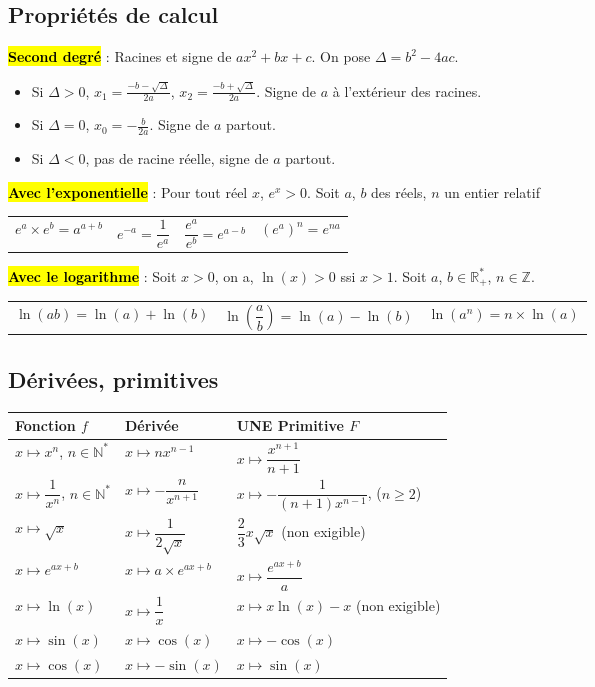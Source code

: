 \documentclass[10pt,fleqn, openany, landscape, twocolumn]{book} %
\begin{document}
\subsection*{Propriétés de calcul}

\hl{\textbf{Second degré}} : Racines et signe de $ax^2+bx+c$. On pose $\Delta=b^2-4ac$.
\begin{itemize}
\item Si $\Delta >0$, $x_1=\frac{-b-\sqrt{\Delta}}{2a}$, $x_2=\frac{-b+\sqrt{\Delta}}{2a}$. Signe de $a$ à l'extérieur des racines.
\item Si $\Delta=0$, $x_0=-\frac{b}{2a}$. Signe de $a$ partout.
\item Si $\Delta<0$, pas de racine réelle, signe de $a$ partout.
\end{itemize}

\hl{\textbf{Avec l'exponentielle}} : Pour tout réel $x$, $e^x>0$. Soit $a$, $b$ des réels, $n$ un entier relatif

\begin{tabularx}{\linewidth}{XXXX}
$e^a\times e^b = a^{a+b}$ & $e^{-a}=\dfrac{1}{e^a}$ & $\dfrac{e^a}{e^b}=e^{a-b}$ & $(e^a)^n=e^{na}$
\end{tabularx}

\hl{\textbf{Avec le logarithme}} : Soit $x>0$, on a, $\ln(x)>0$ ssi $x>1$. Soit $a$, $b \in \mathbb{R}_+^*$, $n\in\mathbb{Z}$.

\begin{tabularx}{\linewidth}{XXX}
$\ln(ab)=\ln(a)+\ln(b)$ & $\ln\left(\dfrac{a}{b}\right)=\ln(a)-\ln(b)$ & $\ln(a^n)=n \times \ln(a)$
\end{tabularx}

\subsection*{Dérivées, primitives}
\renewcommand{\arraystretch}{2.2}
\begin{tabularx}{\linewidth}{|X|X|X|}

\hline
Fonction $f$ & Dérivée & \textbf{UNE} Primitive $F$  \\
\hline
$x \mapsto x^n$, $n\in \mathbb{N}^*$ & $x\mapsto nx^{n-1}$ & $x\mapsto \dfrac{x^{n+1}}{n+1}$   \\
\hline
$x \mapsto \dfrac{1}{x^n}$, $n\in \mathbb{N}^*$ & $x\mapsto -\dfrac{n}{x^{n+1}}$ & $x\mapsto -\dfrac{1}{(n+1)x^{n-1}}$, ($n \geqslant 2$) \\
\hline
$x\mapsto \sqrt{x}$ & $x \mapsto\dfrac{1}{2\sqrt{x}}$ & $\dfrac{2}{3}x\sqrt{x}$ (non exigible)  \\
\hline
$x \mapsto e^{ax+b}$ & $x\mapsto a \times e^{ax+b}$ & $x\mapsto \dfrac{e^{ax+b}}{a}$ \\
\hline
$x \mapsto \ln(x)$ & $x\mapsto \dfrac{1}{x}$ &  $x\mapsto x\ln(x)-x$ (non exigible)  \\
\hline
$x \mapsto \sin(x)$ & $x\mapsto \cos(x)$ &  $x\mapsto -\cos(x)$   \\
\hline
$x \mapsto \cos(x)$ & $x\mapsto -\sin(x)$ &  $x\mapsto \sin(x)$   \\
\hline
\end{tabularx}
\end{document}
